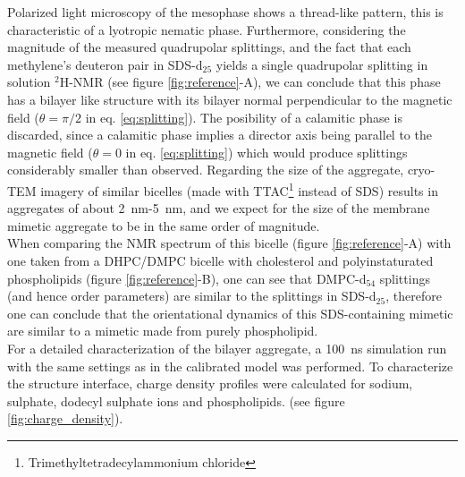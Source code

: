 \documentclass[3p,preprint,review]{elsarticle}
\begin{document}
	Polarized light microscopy of the mesophase shows a thread-like pattern, this
	is
	characteristic of a lyotropic nematic phase\cite{dierking2006textures}.
	Furthermore, considering the magnitude of the measured quadrupolar
	splittings, and the fact that each methylene's deuteron pair in SDS-d$_{25}$
	yields
	a
	single quadrupolar splitting in solution $^2$H-NMR (see figure
	\ref{fig:reference}-A), we can conclude that this phase has a bilayer
	like structure with its bilayer normal perpendicular
	to the magnetic field ($\theta=\pi/2$ in eq. \ref{eq:splitting}). The
	posibility of a calamitic phase is discarded, since a calamitic phase implies a
	director axis being parallel to the magnetic field ($\theta=0$ in eq.
	\ref{eq:splitting}) which would produce splittings considerably smaller than
	observed. Regarding the size of the aggregate, cryo-TEM imagery of similar
  bicelles (made with TTAC\footnote{Trimethyltetradecylammonium chloride} instead of SDS)
  results in aggregates of about
  \SI{2}{nm}-\SI{5}{nm}\cite{Ruiz-Fernandez2016}, and we expect for the size of
  the membrane mimetic aggregate to be in the same order of magnitude.\\
   When comparing the NMR spectrum of this bicelle (figure \ref{fig:reference}-A) with one taken from a DHPC/DMPC bicelle with cholesterol and polyinstaturated phospholipids (figure \ref{fig:reference}-B)\cite{Minto2004}, one can see that DMPC-d$_{54}$ splittings (and hence order parameters) are similar to the splittings in SDS-d$_{25}$, therefore one can conclude that the orientational dynamics of this SDS-containing mimetic are similar to a mimetic made from purely phospholipid.\\ 
	
	For a detailed characterization of the bilayer aggregate, a \SI{100}{ns}
	simulation run with the same settings as in the calibrated model was performed.
	To characterize the structure
	interface, charge density profiles were calculated for sodium, sulphate,
	dodecyl sulphate ions and phospholipids. (see figure \ref{fig:charge_density}).
	
\end{document}
